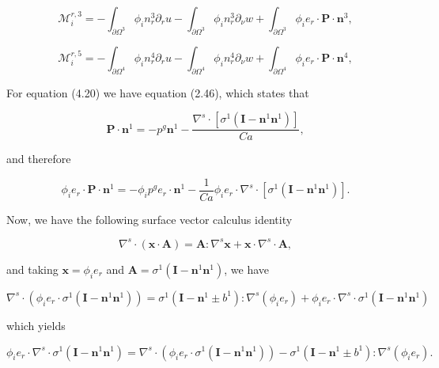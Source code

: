 \documentclass{article}
\begin{document}
\begin{equation}
\mathcal{M}_{i}^{r,3} = -\int_{\partial \Omega^{3}}\phi_{i}n_{r}^{3}\partial_{r}u - \int_{\partial \Omega^{3}}\phi_{i}n_{r}^{3}\partial_{\nu}w + \int_{\partial \Omega^{3}}\phi_{i}e_{r}\cdot \pmb{P}\cdot \pmb{n}^{3}, \tag{4.22}
\end{equation}

\begin{equation}
\mathcal{M}_{i}^{r,5} = -\int_{\partial \Omega^{4}}\phi_{i}n_{r}^{4}\partial_{r}u - \int_{\partial \Omega^{4}}\phi_{i}n_{r}^{4}\partial_{\nu}w + \int_{\partial \Omega^{4}}\phi_{i}e_{r}\cdot \pmb{P}\cdot \pmb{n}^{4}, \tag{4.23}
\end{equation}

For equation (4.20) we have equation (2.46), which states that

\begin{equation}
\pmb {P}\cdot \pmb{n}^{1} = -p^{g}\pmb{n}^{1} - \frac{\nabla^{s}\cdot[\sigma^{1}(\pmb{I} - \pmb{n}^{1}\pmb{n}^{1})]}{C a}, \tag{4.24}
\end{equation}

and therefore

\begin{equation}
\phi_{i}e_{r}\cdot \pmb{P}\cdot \pmb{n}^{1} = -\phi_{i}p^{g}e_{r}\cdot \pmb{n}^{1} - \frac{1}{C a}\phi_{i}e_{r}\cdot \nabla^{s}\cdot [\sigma^{1}(\pmb{I} - \pmb{n}^{1}\pmb{n}^{1})]. \tag{4.25}
\end{equation}

Now, we have the following surface vector calculus identity

\begin{equation}
\nabla^{s}\cdot (\pmb {x}\cdot \pmb {A}) = \pmb {A}\colon \nabla^{s}\pmb {x} + \pmb {x}\cdot \nabla^{s}\cdot \pmb {A}, \tag{4.26}
\end{equation}

and taking \(\pmb {x} = \phi_{i}e_{r}\) and \(\pmb {A} = \sigma^{1}(\pmb {I} - \pmb{n}^{1}\pmb{n}^{1})\), we have

\begin{equation}
\nabla^{s}\cdot (\phi_{i}e_{r}\cdot \sigma^{1}(\pmb {I} - \pmb{n}^{1}\pmb{n}^{1})) = \sigma^{1}(\pmb {I} - \pmb{n}^{1}\pm b^{1})\colon \nabla^{s}(\phi_{i}e_{r}) + \phi_{i}e_{r}\cdot \nabla^{s}\cdot \sigma^{1}(\pmb {I} - \pmb{n}^{1}\pmb{n}^{1}) \tag{4.27}
\end{equation}

which yields

\begin{equation}
\phi_{i}e_{r}\cdot \nabla^{s}\cdot \sigma^{1}(\pmb {I} - \pmb{n}^{1}\pmb{n}^{1}) = \nabla^{s}\cdot (\phi_{i}e_{r}\cdot \sigma^{1}(\pmb {I} - \pmb{n}^{1}\pmb{n}^{1})) - \sigma^{1}(\pmb {I} - \pmb{n}^{1}\pm b^{1})\colon \nabla^{s}(\phi_{i}e_{r}). \tag{4.28}
\end{equation}
\end{document}
